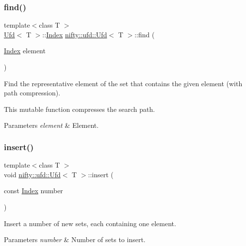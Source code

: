 \subsubsection{\texorpdfstring{find()}{find()}\hspace{0.1cm}{\footnotesize\ttfamily [2/2]}}
{\footnotesize\ttfamily template$<$class T $>$ \\
\hyperlink{classnifty_1_1ufd_1_1Ufd}{Ufd}$<$ T $>$\+::\hyperlink{classnifty_1_1ufd_1_1Ufd_a0a9a7ab02b6d77fb2035234cbda8b3a7}{Index} \hyperlink{classnifty_1_1ufd_1_1Ufd}{nifty\+::ufd\+::\+Ufd}$<$ T $>$\+::find (\begin{DoxyParamCaption}\item[{\hyperlink{classnifty_1_1ufd_1_1Ufd_a0a9a7ab02b6d77fb2035234cbda8b3a7}{Index}}]{element }\end{DoxyParamCaption})\hspace{0.3cm}{\ttfamily [inline]}}

Find the representative element of the set that contains the given element (with path compression).

This mutable function compresses the search path.


\begin{DoxyParams}{Parameters}
{\em element} & Element. \\
\hline
\end{DoxyParams}
\mbox{\label{classnifty_1_1ufd_1_1Ufd_a89f525ed27ef959ff30666daa13741fe}} 
\subsubsection{\texorpdfstring{insert()}{insert()}}
{\footnotesize\ttfamily template$<$class T $>$ \\
void \hyperlink{classnifty_1_1ufd_1_1Ufd}{nifty\+::ufd\+::\+Ufd}$<$ T $>$\+::insert (\begin{DoxyParamCaption}\item[{const \hyperlink{classnifty_1_1ufd_1_1Ufd_a0a9a7ab02b6d77fb2035234cbda8b3a7}{Index}}]{number }\end{DoxyParamCaption})\hspace{0.3cm}{\ttfamily [inline]}}

Insert a number of new sets, each containing one element.


\begin{DoxyParams}{Parameters}
{\em number} & Number of sets to insert. \\
\hline
\end{DoxyParams}
\mbox{\label{classnifty_1_1ufd_1_1Ufd_aeb49fa316c1956ce636e68e96e003d2f}} 
